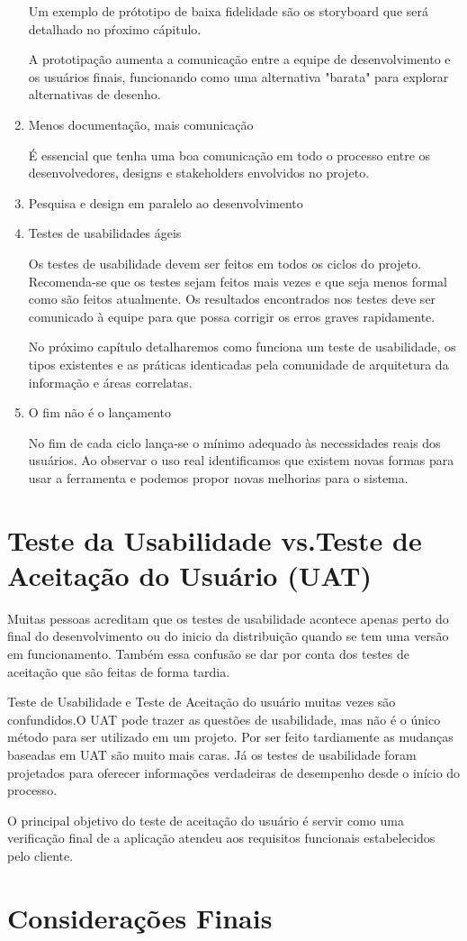 \begin{enumerate}
	Um exemplo de prótotipo de baixa fidelidade são os storyboard que será detalhado no pŕoximo cápitulo. 

	A prototipação aumenta a comunicação entre a equipe de desenvolvimento e os usuários finais, funcionando como uma alternativa "barata" para explorar alternativas de desenho.
	
\item Menos documentação, mais comunicação

	É essencial que tenha uma boa comunicação em todo o processo entre os desenvolvedores, designs e stakeholders envolvidos no projeto.

\item Pesquisa e design em paralelo ao desenvolvimento


\item Testes de usabilidades ágeis

	Os testes de usabilidade devem ser feitos em todos os ciclos do projeto. Recomenda-se que os testes sejam feitos mais vezes e que seja menos formal como são feitos atualmente. Os resultados encontrados nos testes deve ser comunicado à equipe para que possa corrigir os erros  graves rapidamente.

	No próximo capítulo detalharemos como funciona um teste de usabilidade, os tipos existentes e as práticas identicadas pela comunidade de arquitetura da informação e áreas correlatas.

\item O fim não é o lançamento

	No fim de cada ciclo lança-se o mínimo adequado às necessidades reais dos usuários. Ao observar o uso real identificamos que existem novas formas para usar a ferramenta e podemos propor novas melhorias para o sistema. 
	
\end{enumerate}



\section{Teste da Usabilidade vs.Teste de Aceitação do Usuário (UAT)}

	Muitas pessoas acreditam que os testes de usabilidade acontece apenas perto do final do desenvolvimento ou do inicio da distribuição quando se tem uma versão em funcionamento. Também essa confusão se dar por conta dos testes de aceitação que são feitas de forma tardia. 

	Teste de Usabilidade e Teste de Aceitação do usuário muitas vezes são confundidos.O UAT pode trazer as questões de usabilidade, mas não é o único método para ser utilizado em um projeto. Por ser feito tardiamente as mudanças baseadas em UAT são muito mais caras. Já os testes de usabilidade foram projetados para oferecer informações verdadeiras de desempenho desde o início do processo.  
	
	O principal objetivo do teste de aceitação do usuário é servir como uma verificação final de a aplicação atendeu aos requisitos funcionais estabelecidos pelo cliente. 



\section{Considerações Finais}


	




